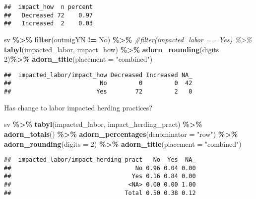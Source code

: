 \documentclass[
]{article}
\newenvironment{Shaded}{\begin{snugshade}}{\end{snugshade}}
\newcommand{\AttributeTok}[1]{\textcolor[rgb]{0.13,0.29,0.53}{#1}}
\newcommand{\CommentTok}[1]{\textcolor[rgb]{0.56,0.35,0.01}{\textit{#1}}}
\newcommand{\DecValTok}[1]{\textcolor[rgb]{0.00,0.00,0.81}{#1}}
\newcommand{\FunctionTok}[1]{\textcolor[rgb]{0.13,0.29,0.53}{\textbf{#1}}}
\newcommand{\NormalTok}[1]{#1}
\newcommand{\SpecialCharTok}[1]{\textcolor[rgb]{0.81,0.36,0.00}{\textbf{#1}}}
\newcommand{\StringTok}[1]{\textcolor[rgb]{0.31,0.60,0.02}{#1}}
\begin{document}
\begin{verbatim}
##  impact_how  n percent
##   Decreased 72    0.97
##   Increased  2    0.03
\end{verbatim}

\begin{Shaded}
\begin{Highlighting}[]
\NormalTok{sv }\SpecialCharTok{\%\textgreater{}\%} \FunctionTok{filter}\NormalTok{(outmigYN }\SpecialCharTok{!=} \StringTok{\textquotesingle{}No\textquotesingle{}}\NormalTok{) }\SpecialCharTok{\%\textgreater{}\%}
  \CommentTok{\#filter(impacted\_labor == \textquotesingle{}Yes\textquotesingle{}) \%\textgreater{}\%}
  \FunctionTok{tabyl}\NormalTok{(impacted\_labor, impact\_how) }\SpecialCharTok{\%\textgreater{}\%}
  \FunctionTok{adorn\_rounding}\NormalTok{(}\AttributeTok{digits =} \DecValTok{2}\NormalTok{)}\SpecialCharTok{\%\textgreater{}\%}
  \FunctionTok{adorn\_title}\NormalTok{(}\AttributeTok{placement =} \StringTok{"combined"}\NormalTok{) }
\end{Highlighting}
\end{Shaded}

\begin{verbatim}
##  impacted_labor/impact_how Decreased Increased NA_
##                         No         0         0  42
##                        Yes        72         2   0
\end{verbatim}

Has change to labor impacted herding practices?

\begin{Shaded}
\begin{Highlighting}[]
\NormalTok{sv }\SpecialCharTok{\%\textgreater{}\%} 
  \FunctionTok{tabyl}\NormalTok{(impacted\_labor, impact\_herding\_pract) }\SpecialCharTok{\%\textgreater{}\%}
  \FunctionTok{adorn\_totals}\NormalTok{() }\SpecialCharTok{\%\textgreater{}\%}
  \FunctionTok{adorn\_percentages}\NormalTok{(}\AttributeTok{denominator =} \StringTok{"row"}\NormalTok{) }\SpecialCharTok{\%\textgreater{}\%}
  \FunctionTok{adorn\_rounding}\NormalTok{(}\AttributeTok{digits =} \DecValTok{2}\NormalTok{) }\SpecialCharTok{\%\textgreater{}\%}
  \FunctionTok{adorn\_title}\NormalTok{(}\AttributeTok{placement =} \StringTok{"combined"}\NormalTok{) }
\end{Highlighting}
\end{Shaded}

\begin{verbatim}
##  impacted_labor/impact_herding_pract   No  Yes  NA_
##                                   No 0.96 0.04 0.00
##                                  Yes 0.16 0.84 0.00
##                                 <NA> 0.00 0.00 1.00
##                                Total 0.50 0.38 0.12
\end{verbatim}
\end{document}
